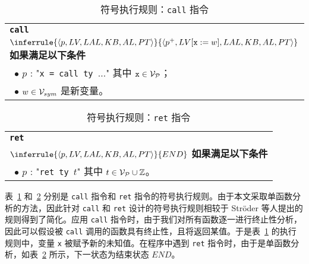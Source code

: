 \begin{table}[htbp]
\caption{符号执行规则：\texttt{call} 指令}
\label{tab:rule-call}
\begin{tabularx}{\textwidth}{|X|}
\hline
\textbf{\texttt{call}} \\
{\centering $
\inferrule
   {\lb p, LV, LAL, KB, AL, PT\rb}
   {\lb p^+, LV[\texttt{x} := w], LAL, KB, AL, PT\rb} 
$ \\}
\textbf{如果满足以下条件} \\
~$\bullet$ $p$ : "\texttt{x = call ty $\ldots$}" 其中 $\texttt{x}\in\mathcal{V}_{\mathcal{P}}$；\\
~$\bullet$ $w\in\mathcal{V}_{sym}$ 是新变量。 \\
\hline
\end{tabularx}
\end{table}

\begin{table}[htbp]
\caption{符号执行规则：\texttt{ret} 指令}
\label{tab:rule-ret}
\begin{tabularx}{\textwidth}{|X|}
\hline
\textbf{\texttt{ret}} \\
{\centering $
\inferrule
   {\lb p, LV, LAL, KB, AL, PT\rb}
   {END}
$ \\}
\textbf{如果满足以下条件} \\
~$\bullet$ $p$ : "\texttt{ret ty $t$}" 其中 $t\in\mathcal{V}_{\mathcal{P}}\cup\mathbb{Z}$。\\
\hline
\end{tabularx}
\end{table}

表~\ref{tab:rule-call} 和~\ref{tab:rule-ret} 分别是 \verb|call| 指令和 \verb|ret| 指令的符号执行规则。由于本文采取单函数分析的方法，因此针对 \verb|call| 和 \verb|ret| 设计的符号执行规则相较于 Str\"oder 等人提出的规则得到了简化。应用 \verb|call| 指令时，由于我们对所有函数逐一进行终止性分析，因此可以假设被 \verb|call| 调用的函数具有终止性，且将返回某值。于是表~\ref{tab:rule-call} 的执行规则中，变量 \verb|x| 被赋予新的未知值。在程序中遇到 \verb|ret| 指令时，由于是单函数分析，如表~\ref{tab:rule-ret} 所示，下一状态为结束状态 $END$。

